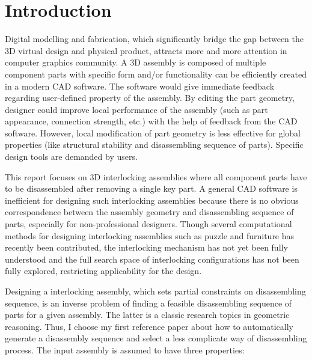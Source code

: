 
\section{Introduction}
\label{sec:introduction}
Digital modelling and fabrication, which significantly bridge the gap between the 3D virtual design and physical product, attracts more and more attention in computer graphics community. A 3D assembly is composed of multiple component parts with specific form and/or functionality can be efficiently created in a modern CAD software. The software would give immediate feedback regarding user-defined property of the assembly. By editing the part geometry, designer could improve local performance of the assembly (such as part appearance, connection strength, etc.) with the help of feedback from the CAD software. However, local modification of part geometry is less effective for global properties (like structural stability and disassembling sequence of parts). Specific design tools are demanded by users.

This report focuses on 3D interlocking assemblies where all component parts have to be disassembled after removing a single key part. A general CAD software is inefficient for designing such interlocking assemblies because there is no obvious correspondence between the assembly geometry and disassembling sequence of parts, especially for non-professional designers. Though several computational methods for designing interlocking assemblies such as puzzle and furniture has recently been contributed, the interlocking mechanism has not yet been fully understood and the full search space of interlocking configurations has not been fully explored, restricting applicability for the design.

Designing a interlocking assembly, which sets partial constraints on disassembling sequence, is an inverse problem of finding a feasible disassembling sequence of parts for a given assembly. The latter is a classic research topics in geometric reasoning. Thus, I choose my first reference paper \cite{Wilson-1994-GeometricReasoning} about how to automatically generate a disassembly sequence and select a less complicate way of disassembling process. The input assembly is assumed to have three properties:

